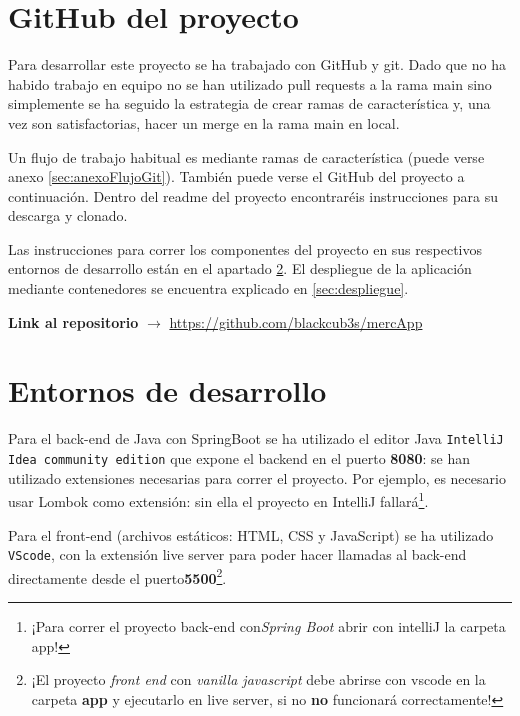 \documentclass[a4paper,12pt]{report}
\begin{document}
	
	
				
			\section{GitHub del proyecto}
			
				Para desarrollar este proyecto se ha trabajado con GitHub y git. Dado que no ha habido trabajo en equipo no se han utilizado pull requests a la rama main sino simplemente se ha seguido la estrategia de crear ramas de característica y, una vez son satisfactorias, hacer un merge en la rama main en local.
				
				Un flujo de trabajo habitual es mediante ramas de característica (puede verse anexo \ref{sec:anexoFlujoGit}). También puede verse el GitHub del proyecto a continuación. Dentro del readme del proyecto encontraréis instrucciones para su descarga y clonado.
				
				Las instrucciones para correr los componentes del proyecto en sus respectivos entornos de desarrollo están en el apartado \ref{sec:entornosDesarrollo}. El despliegue de la aplicación mediante contenedores se encuentra explicado en \ref{sec:despliegue}.
			

			
			
			
			
				\textbf{Link al repositorio} $\rightarrow$ \href{https://github.com/blackcub3s/mercApp}{https://github.com/blackcub3s/mercApp} 
			
	
	
		
			\section{Entornos de desarrollo}
			\label{sec:entornosDesarrollo}
			
				Para el back-end de Java con SpringBoot se ha utilizado el editor Java \texttt{IntelliJ Idea community edition} que expone el backend en el puerto\textbf{ 8080}: se han utilizado extensiones necesarias para correr el proyecto. Por ejemplo, es necesario usar Lombok como extensión: sin ella el proyecto en IntelliJ fallará\footnote{¡Para correr el proyecto back-end con\textit{Spring Boot} abrir con intelliJ la carpeta app!}.
				
				Para el front-end (archivos estáticos: HTML, CSS y JavaScript) se ha utilizado \texttt{VScode}, con la extensión live server para poder hacer llamadas al back-end directamente desde el puerto\textbf{5500}\footnote{¡El proyecto \textit{front end} con \textit{vanilla javascript} debe abrirse con vscode en la carpeta \textbf{app} y ejecutarlo en live server, si no \textbf{no} funcionará correctamente!}.
				
\end{document}

